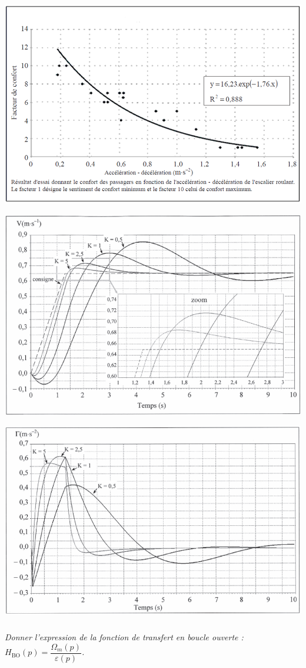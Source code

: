 \documentclass[10pt,fleqn]{article} %
\begin{document}
\begin{center}
	\includegraphics[width=.8\linewidth]{images/fig_04}
	
	\includegraphics[width=.8\linewidth]{images/fig_05}
	
	\includegraphics[width=.8\linewidth]{images/fig_06}
\end{center}

\subparagraph{}
\textit{Donner l’expression de la fonction de transfert en boucle ouverte : $H_{\text{BO}} (p) =\dfrac{\Omega_m (p)}{\varepsilon (p)}$.}
\end{document}
